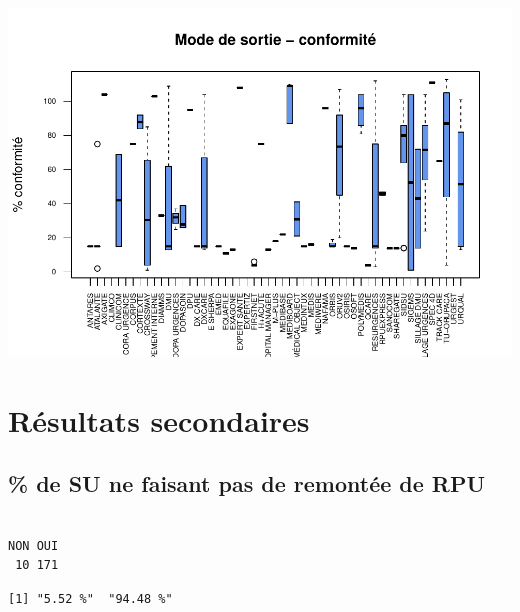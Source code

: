 \documentclass[]{article}
\begin{document}
\includegraphics{septembre2015_files/figure-latex/unnamed-chunk-29-1.pdf}

\section{Résultats secondaires}\label{resultats-secondaires}

\subsection{\% de SU ne faisant pas de remontée de
RPU}\label{de-su-ne-faisant-pas-de-remontee-de-rpu}

\begin{verbatim}

NON OUI 
 10 171 
\end{verbatim}

\begin{verbatim}
[1] "5.52 %"  "94.48 %"
\end{verbatim}
\end{document}
